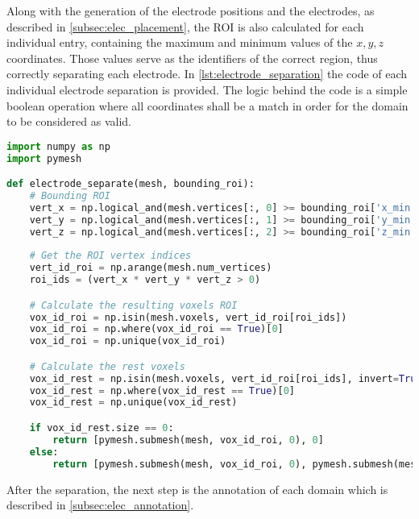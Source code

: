 Along with the generation of the electrode positions and the electrodes, as described in \ref{subsec:elec_placement}, the \gls{ROI} is also calculated for each individual entry, containing the maximum and minimum values of the $x,y,z$ coordinates. Those values serve as the identifiers of the correct region, thus correctly separating each electrode. In \autoref{lst:electrode_separation} the code of each individual electrode separation is provided. The logic behind the code is a simple boolean operation where all coordinates shall be a match in order for the domain to be considered as valid.
\begin{lstlisting}[language=Python,caption={Python code for electrode separation},captionpos=b, label=lst:electrode_separation]
import numpy as np
import pymesh

def electrode_separate(mesh, bounding_roi):
	# Bounding ROI
	vert_x = np.logical_and(mesh.vertices[:, 0] >= bounding_roi['x_min'], mesh.vertices[:, 0] <= bounding_roi['x_max'])
	vert_y = np.logical_and(mesh.vertices[:, 1] >= bounding_roi['y_min'], mesh.vertices[:, 1] <= bounding_roi['y_max'])
	vert_z = np.logical_and(mesh.vertices[:, 2] >= bounding_roi['z_min'], mesh.vertices[:, 2] <= bounding_roi['z_max'])
	
	# Get the ROI vertex indices
	vert_id_roi = np.arange(mesh.num_vertices)
	roi_ids = (vert_x * vert_y * vert_z > 0)

	# Calculate the resulting voxels ROI
	vox_id_roi = np.isin(mesh.voxels, vert_id_roi[roi_ids])
	vox_id_roi = np.where(vox_id_roi == True)[0]
	vox_id_roi = np.unique(vox_id_roi)

	# Calculate the rest voxels
	vox_id_rest = np.isin(mesh.voxels, vert_id_roi[roi_ids], invert=True)
	vox_id_rest = np.where(vox_id_rest == True)[0]
	vox_id_rest = np.unique(vox_id_rest)

	if vox_id_rest.size == 0:
		return [pymesh.submesh(mesh, vox_id_roi, 0), 0]
	else:
		return [pymesh.submesh(mesh, vox_id_roi, 0), pymesh.submesh(mesh, vox_id_rest, 0)]
\end{lstlisting}

\noindent After the separation, the next step is the annotation of each domain which is described in \ref{subsec:elec_annotation}.


